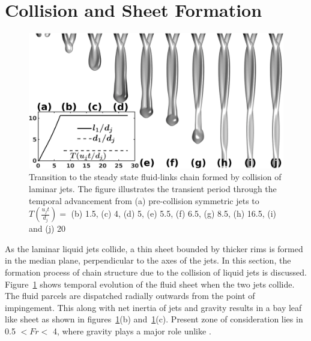 \documentclass{jfm}
\begin{document}
\section{Collision and Sheet Formation}
\begin{figure}
	\centering
	\includegraphics[width=0.6\linewidth]{Figure3}
	\caption{Transition to the steady state fluid-links chain formed by collision of laminar jets. The figure illustrates the transient period through the temporal advancement from (a) pre-collision symmetric jets to $T (\frac{u_jt}{d_j}) = $ (b) 1.5, (c) 4, (d) 5, (e) 5.5, (f) 6.5, (g) 8.5, (h) 16.5, (i) and (j) 20}
	\label{Figure::transient}\vspace{-3.2mm}
\end{figure}
As the laminar liquid jets collide, a thin sheet bounded by thicker rims is formed in the median plane, perpendicular to the axes of the jets. In this section, the formation process of chain structure due to the collision of liquid jets is discussed. Figure~\ref{Figure::transient} shows temporal evolution of the fluid sheet when the two jets collide. The fluid parcels are dispatched radially outwards from the point of impingement. This along with net inertia of jets and gravity results in a bay leaf like sheet as shown in figures~\ref{Figure::transient}(b) and~\ref{Figure::transient}(c). Present zone of consideration lies in 0.5 $< Fr <$ 4, where gravity plays a major role unlike \cite{bush2004collision,bremond2006atomization}.
\end{document}
